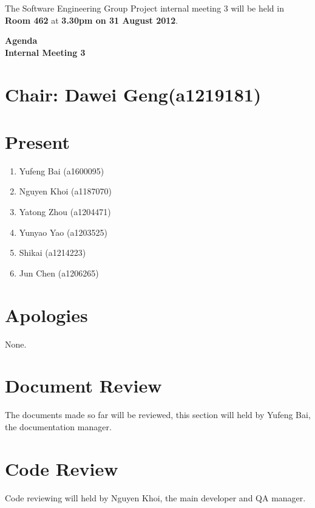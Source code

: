 \documentclass[11pt, a4paper]{article}
\begin{document}
\noindent The Software Engineering Group Project internal meeting 3 will be held in {\bf Room 462} at {\bf 3.30pm on 31 August 2012}.


\vspace*{15pt}

\begin{center}
\huge \bf Agenda \\Internal Meeting 3
\end{center}



\section*{Chair: Dawei Geng(a1219181)}
\section*{Present}
\begin{enumerate}
\item Yufeng Bai (a1600095)
\item Nguyen Khoi (a1187070)
\item Yatong Zhou (a1204471)
\item Yunyao Yao (a1203525)
\item Shikai (a1214223)
\item Jun Chen (a1206265)
\end{enumerate}
\section{Apologies}
None.

\section{Document Review}
The documents made so far will be reviewed, this section will held by Yufeng Bai, the documentation manager.

\section{Code Review}
Code reviewing will held by Nguyen Khoi, the main developer and QA manager.
\end{document}
